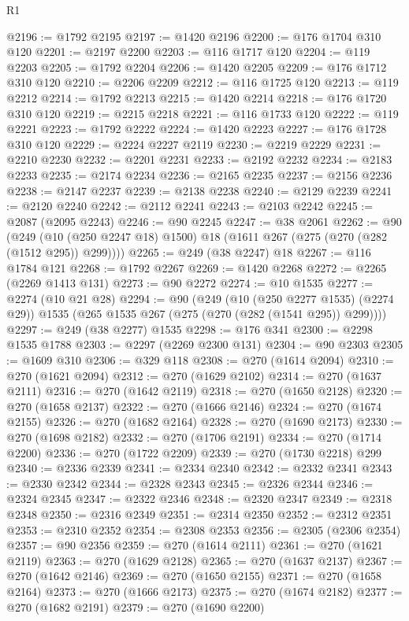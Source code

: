 \begin{lexlean}{R1}
\begin{coremodule}
@2196 := @1792 @2195
@2197 := @1420 @2196
@2200 := @176 @1704 @310 @120
@2201 := @2197 @2200
@2203 := @116 @1717 @120
@2204 := @119 @2203
@2205 := @1792 @2204
@2206 := @1420 @2205
@2209 := @176 @1712 @310 @120
@2210 := @2206 @2209
@2212 := @116 @1725 @120
@2213 := @119 @2212
@2214 := @1792 @2213
@2215 := @1420 @2214
@2218 := @176 @1720 @310 @120
@2219 := @2215 @2218
@2221 := @116 @1733 @120
@2222 := @119 @2221
@2223 := @1792 @2222
@2224 := @1420 @2223
@2227 := @176 @1728 @310 @120
@2229 := @2224 @2227 @2119
@2230 := @2219 @2229
@2231 := @2210 @2230
@2232 := @2201 @2231
@2233 := @2192 @2232
@2234 := @2183 @2233
@2235 := @2174 @2234
@2236 := @2165 @2235
@2237 := @2156 @2236
@2238 := @2147 @2237
@2239 := @2138 @2238
@2240 := @2129 @2239
@2241 := @2120 @2240
@2242 := @2112 @2241
@2243 := @2103 @2242
@2245 := @2087 (@2095 @2243)
@2246 := @90 @2245
@2247 := @38 @2061
@2262 := @90
    (@249 (@10 (@250 @2247 @18) @1500) @18 (@1611 @267 (@275 (@270 (@282 (@1512 @295)) @299))))
@2265 := @249 (@38 @2247) @18
@2267 := @116 @1784 @121
@2268 := @1792 @2267
@2269 := @1420 @2268
@2272 := @2265 (@2269 @1413 @131)
@2273 := @90 @2272
@2274 := @10 @1535
@2277 := @2274 (@10 @21 @28)
@2294 := @90
    (@249
      (@10 (@250 @2277 @1535) (@2274 @29))
      @1535
      (@265 @1535 @267 (@275 (@270 (@282 (@1541 @295)) @299))))
@2297 := @249 (@38 @2277) @1535
@2298 := @176 @341
@2300 := @2298 @1535 @1788
@2303 := @2297 (@2269 @2300 @131)
@2304 := @90 @2303
@2305 := @1609 @310
@2306 := @329 @118
@2308 := @270 (@1614 @2094)
@2310 := @270 (@1621 @2094)
@2312 := @270 (@1629 @2102)
@2314 := @270 (@1637 @2111)
@2316 := @270 (@1642 @2119)
@2318 := @270 (@1650 @2128)
@2320 := @270 (@1658 @2137)
@2322 := @270 (@1666 @2146)
@2324 := @270 (@1674 @2155)
@2326 := @270 (@1682 @2164)
@2328 := @270 (@1690 @2173)
@2330 := @270 (@1698 @2182)
@2332 := @270 (@1706 @2191)
@2334 := @270 (@1714 @2200)
@2336 := @270 (@1722 @2209)
@2339 := @270 (@1730 @2218) @299
@2340 := @2336 @2339
@2341 := @2334 @2340
@2342 := @2332 @2341
@2343 := @2330 @2342
@2344 := @2328 @2343
@2345 := @2326 @2344
@2346 := @2324 @2345
@2347 := @2322 @2346
@2348 := @2320 @2347
@2349 := @2318 @2348
@2350 := @2316 @2349
@2351 := @2314 @2350
@2352 := @2312 @2351
@2353 := @2310 @2352
@2354 := @2308 @2353
@2356 := @2305 (@2306 @2354)
@2357 := @90 @2356
@2359 := @270 (@1614 @2111)
@2361 := @270 (@1621 @2119)
@2363 := @270 (@1629 @2128)
@2365 := @270 (@1637 @2137)
@2367 := @270 (@1642 @2146)
@2369 := @270 (@1650 @2155)
@2371 := @270 (@1658 @2164)
@2373 := @270 (@1666 @2173)
@2375 := @270 (@1674 @2182)
@2377 := @270 (@1682 @2191)
@2379 := @270 (@1690 @2200)

\end{coremodule}
\end{lexlean}
